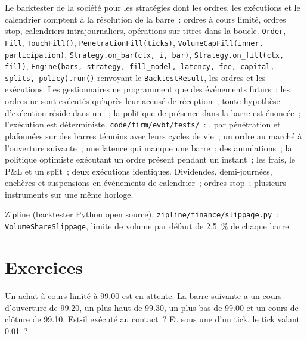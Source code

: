 \begin{build}
 Le backtester de la société pour les stratégies dont les ordres, les exécutions et le calendrier comptent à la résolution de la barre~: ordres à cours limité, ordres stop, calendriers
intrajournaliers, opérations sur titres dans la boucle.
 \texttt{Order}, \texttt{Fill}, \texttt{TouchFill()}, \texttt{PenetrationFill(ticks)}, \texttt{VolumeCapFill(inner, participation)},
\texttt{Strategy.on\_bar(ctx, i, bar)}, \texttt{Strategy.on\_fill(ctx, fill)},
\texttt{Engine(bars, strategy, fill\_model, latency, fee, capital, splits, policy).run()} renvoyant le \texttt{BacktestResult}, les ordres et les exécutions.
 Les gestionnaires ne programment que des événements futurs~; les ordres ne sont exécutés qu'après leur accusé de réception~; toute hypothèse d'exécution réside dans un ~; la
politique de présence dans la barre est énoncée~; l'exécution est déterministe.
 \texttt{code/firm/evbt/tests/}~: , par pénétration et plafonnées sur des barres témoins avec leurs cycles de vie~; un ordre au marché à
l'ouverture suivante~; une latence qui manque une barre~; des annulations~; la politique optimiste exécutant un ordre présent pendant un instant~; les frais, le P\&L et un split~; deux exécutions identiques.
 Dividendes, demi-journées, enchères et suspensions en événements de calendrier~; ordres stop~; plusieurs instruments sur une même horloge.
\end{build}

\begin{omsources}
\item Zipline (backtester Python open source), \texttt{zipline/finance/slippage.py}~: \texttt{VolumeShareSlippage}, limite de volume par défaut de 2.5~\% de chaque barre.
\end{omsources}

\section{Exercices}

\begin{exercise}[$\star$]\label{exo:rs:event-driven-backtests:1}
Un achat à cours limité à 99.00 est en attente. La barre suivante a un cours d'ouverture de 99.20, un plus haut de 99.30, un plus bas de 99.00 et un cours de clôture de 99.10. Est-il exécuté au contact~? Et sous une 
d'un tick, le tick valant 0.01~?
\end{exercise}

